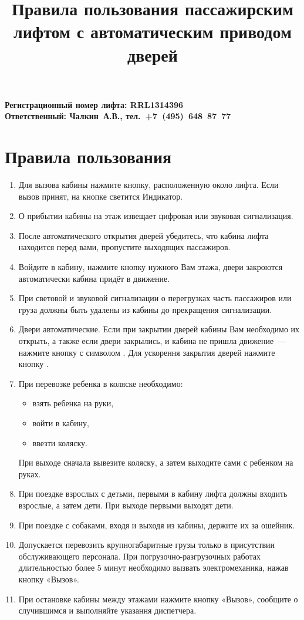 \documentclass[10pt, a4paper]{article}
\title{Правила пользования пассажирским лифтом с автоматическим приводом дверей}
\newcommand{\ffbox}[1]{%
  {%
   \setlength{\fboxsep}{-1\fboxrule}%
   \fbox{\hspace{2.3pt}\strut#1\hspace{2.3pt}}%
  }%
}
\begin{document}
\textbf{
  \mbox{}\hfill Регистрационный номер лифта: RRL1314396\\
  \mbox{}\hfill Ответственный: Чалкин~А.В., тел.~+7~(495)~648~87~77
}

\section*{Правила пользования}

\begin{enumerate}
  \item Для вызова кабины нажмите кнопку, расположенную около лифта. Если вызов принят, на кнопке светится Индикатор.
  \item О прибытии кабины на этаж извещает цифровая или звуковая сигнализация.
  \item После автоматического открытия дверей убедитесь, что кабина лифта находится перед вами, пропустите выходящих пассажиров.
  \item Войдите в кабину, нажмите кнопку нужного Вам этажа, двери закроются автоматически кабина придёт в движение.
  \item При световой и звуковой сигнализации о перегрузках часть пассажиров или груза должны быть удалены из кабины до прекращения
    сигнализации.
  \item Двери автоматические. Если при закрытии дверей кабины Вам необходимо их открыть, а также если двери закрылись, и кабина не пришла
    движение~--- нажмите кнопку с символом \ffbox{\textlangle~||~\textrangle}. Для ускорення закрытия дверей нажмите кнопку
    \ffbox{\textbf{\textrangle~||~\textlangle}}.
  \item При перевозке ребенка в коляске необходимо:
    \begin{itemize}
      \item взять ребенка на руки,
      \item войти в кабину,
      \item ввезти коляску.
    \end{itemize}
    При выходе сначала вывезите коляску, а затем выходите сами с ребенком на руках.
  \item При поездке взрослых с детьми, первыми в кабину лифта должны входить взрослые, а затем дети. При выходе первыми выходят дети.
  \item При поездке с собаками, входя и выходя из кабины, держите их за ошейник.
  \item Допускается перевозить крупногабаритные грузы только в присутствии обслуживающего персонала. При погрузочно-разгрузочных работах
    длительностью более 5 минут необходимо вызвать электромеханика, нажав кнопку «Вызов».
  \item При остановке кабины между этажами нажмите кнопку «Вызов», сообщите о случившимся и выполняйте указання диспетчера.
\end{enumerate}
\end{document}
